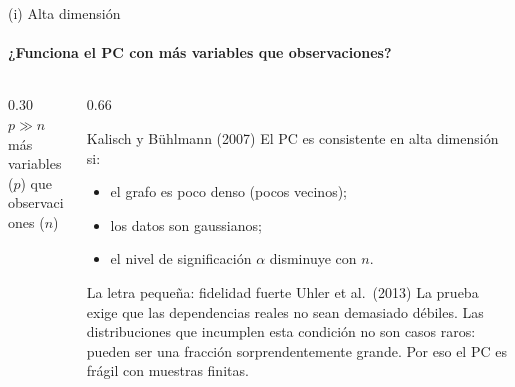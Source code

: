 \documentclass[aspectratio=169,11pt]{beamer}
\begin{document}
\begin{frame}[t]{(i) Alta dimensión}
  \framesubtitle{¿Funciona el PC con más variables que observaciones?}
  \vspace{0.2cm}
  \begin{columns}[T,onlytextwidth]
    \begin{column}{0.30\textwidth}
      \centering
      {\color{upmblue}\fontsize{40}{44}\selectfont\bfseries $p\gg n$}\\[0.3cm]
      {\small más variables ($p$) que observaciones ($n$)}
    \end{column}
    \begin{column}{0.66\textwidth}
      \begin{block}{Kalisch y Bühlmann (2007)}
        El PC es consistente en alta dimensión si:
        \begin{itemize}
          \item el grafo es poco denso (pocos vecinos);
          \item los datos son gaussianos;
          \item el nivel de significación $\alpha$ disminuye con $n$.
        \end{itemize}
      \end{block}
      \begin{alertblock}{La letra pequeña: fidelidad fuerte \textperiodcentered{} Uhler et al.\ (2013)}
        La prueba exige que las dependencias reales no sean demasiado débiles.
        Las distribuciones que incumplen esta condición no son casos raros:
        pueden ser una fracción sorprendentemente grande. Por eso el PC es
        frágil con muestras finitas.
      \end{alertblock}
    \end{column}
  \end{columns}
\end{frame}
\end{document}
